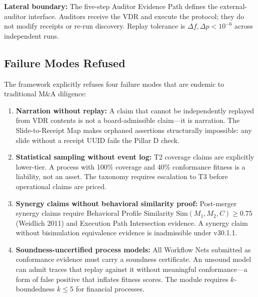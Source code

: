 \textbf{Lateral boundary:} The five-step Auditor Evidence Path defines the external-auditor
interface. Auditors receive the VDR and execute the protocol; they do not modify receipts or
re-run discovery. Replay tolerance is $\Delta f, \Delta p < 10^{-6}$ across independent runs.

\subsection{Failure Modes Refused}
\label{sec:ma-arch-failure-modes}

The framework explicitly refuses four failure modes that are endemic to traditional M\&A
diligence:

\begin{enumerate}
  \item \textbf{Narration without replay:} A claim that cannot be independently replayed
    from VDR contents is not a board-admissible claim---it is narration. The Slide-to-Receipt
    Map makes orphaned assertions structurally impossible: any slide without a receipt UUID
    fails the Pillar D check.
  \item \textbf{Statistical sampling without event log:} T2 coverage claims are explicitly
    lower-tier. A process with 100\% coverage and 40\% conformance fitness is a liability, not
    an asset. The taxonomy requires escalation to T3 before operational claims are priced.
  \item \textbf{Synergy claims without behavioral similarity proof:} Post-merger synergy
    claims require Behavioral Profile Similarity $\text{Sim}(M_1, M_2, C) \ge 0.75$ (Weidlich
    2011) and Execution Path Intersection evidence. A synergy claim without bisimulation
    equivalence evidence is inadmissible under v30.1.1.
  \item \textbf{Soundness-uncertified process models:} All Workflow Nets submitted as
    conformance evidence must carry a soundness certificate. An unsound model can admit traces
    that replay against it without meaningful conformance---a form of false positive that inflates
    fitness scores. The module requires $k$-boundedness $k \le 5$ for financial processes.
\end{enumerate}
